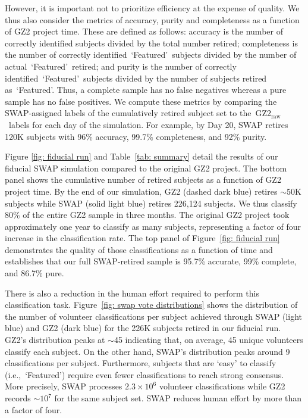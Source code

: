 \documentclass[twocolumn]{aastex6}
\newcommand{\feat}{`Featured'}
\newcommand{\raw}{GZ2$_{\text{raw}}$}
\begin{document}
However, it is important not to prioritize efficiency at the expense of quality. 
We thus also consider the metrics of accuracy, 
purity and completeness as a function of GZ2 project time.  These are 
defined as follows: accuracy is the number of correctly
identified subjects divided by the total number retired; completeness is the number of 
correctly identified~\feat~subjects divided by the number of actual~\feat~retired; 
and purity is the number of correctly identified~\feat~subjects divided by 
the number of subjects retired as~\feat. Thus, a complete sample has no false
negatives whereas a pure sample has no false positives. 
We compute these metrics by comparing the SWAP-assigned labels of the cumulatively 
retired subject set to the~\raw~labels for each day of the simulation. 
For example, by Day 20, SWAP retires 120K subjects with 96\% accuracy,
 99.7\% completeness, and 92\% purity. 

Figure \ref{fig: fiducial run} and Table~\ref{tab: summary} detail the results of 
our fiducial SWAP simulation compared to the original GZ2 project. 
The bottom panel shows the cumulative number of retired subjects as a function of 
GZ2 project time. By the end of our simulation, GZ2 (dashed dark blue)
 retires $\sim$50K subjects while SWAP (solid light blue) retires 226,124 subjects.  
We thus classify 80\% of the entire GZ2 sample in three months. 
The original GZ2 project took approximately one year to classify as many subjects, 
representing a factor of four increase in the classification rate.  
The top panel of Figure~\ref{fig: fiducial run} demonstrates the quality of 
those classifications as a function of time and establishes that our full 
SWAP-retired sample is 95.7\% accurate, 99\% complete, and 86.7\% pure.

There is also a reduction in the human effort required to perform this classification task.
  Figure~\ref{fig: swap vote distributions} shows the distribution of the number 
of volunteer classifications per subject achieved through SWAP (light blue) 
and GZ2 (dark blue) for the 226K subjects retired in our fiducial run. 
GZ2's distribution peaks at $\sim$45 indicating that, on average,
45 unique volunteers classify each subject. On the other hand, SWAP's
distribution peaks around 9 classifications per subject. 
Furthermore, subjects that are `easy' to classify (i.e.,~\feat) require
even fewer classifications to reach strong consensus. 
More precisely, SWAP processes $2.3 \times 10^6$ volunteer 
classifications while GZ2 records $\sim$$10^7$ for the same subject set. 
SWAP reduces human effort by more than a factor of four. 
\end{document}

